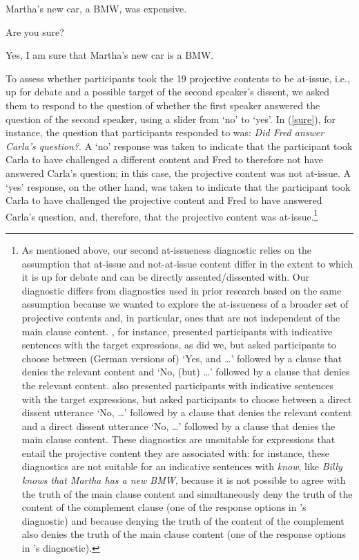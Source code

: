 \documentclass[11pt,fleqn]{article}
\newcommand{\6}{\mbox{$[\hspace*{-.6mm}[$}}
\newcommand{\9}{\mbox{$]\hspace*{-.6mm}]$}}
\newcommand{\citepos}[1]{\citeauthor{#1}'s \citeyear{#1}}
\begin{document}
\begin{exe}
\ex\label{sure} 
\begin{xlist}
 Martha's new car, a BMW, was expensive.

 Are you sure?

 Yes, I am sure that Martha's new car is a BMW.
\end{xlist}
\end{exe}
To assess whether participants took the 19 projective contents to be at-issue, i.e., up for debate and a possible target of the second speaker's dissent, we asked them to respond to the question of whether the first speaker answered the question of the second speaker, using a slider from `no' to `yes'. In (\ref{sure}), for instance, the question that participants responded to was: {\em Did Fred answer Carla's question?}. A `no' response was taken to indicate that the participant took Carla to have challenged a different content and Fred to therefore not have answered Carla's question; in this case, the projective content was not at-issue. A `yes' response, on the other hand, was taken to indicate that the participant took Carla to have challenged the projective content and Fred to have answered Carla's question, and, therefore, that the projective content was at-issue.\footnote{As mentioned above, our second at-issueness diagnostic relies on the assumption that at-issue and not-at-issue content differ in the extent to which it is up for debate and can be directly assented/dissented with. Our diagnostic differs from diagnostics used in prior research based on the same assumption because we wanted to explore the at-issueness of a broader set of projective contents and, in particular, ones that are not independent of the main clause content.  \citet{xue-onea11}, for instance, presented participants with indicative sentences with the target expressions, as did we, but asked participants to choose between (German versions of) `Yes, and \ldots' followed by a clause that denies the relevant content and `No, (but) \ldots' followed by a clause that denies the relevant content.  \citet{syrett-koev2015} also presented participants with indicative sentences with the target expressions, but asked participants to choose between a direct dissent utterance `No, \ldots' followed by a clause that denies the relevant content and a direct dissent utterance `No, \ldots' followed by a clause that denies the main clause content. These diagnostics are unsuitable for expressions that entail the projective content they are associated with: for instance, these diagnostics are not suitable for an indicative sentences with {\em know}, like {\em Billy knows that Martha has a new BMW}, because it is not possible to agree with the truth of the main clause content and simultaneously deny the truth of the content of the complement clause (one of the response options in \citepos{xue-onea11} diagnostic) and because denying the truth of the content of the complement also denies the truth of the main clause content (one of the response options in \citepos{syrett-koev2015} diagnostic).}
\end{document}
